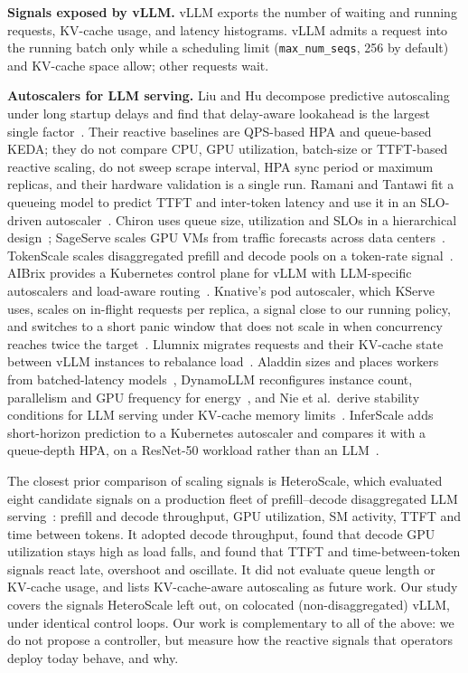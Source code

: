 \documentclass[10pt,conference]{IEEEtran}
\begin{document}
\textbf{Signals exposed by vLLM.} vLLM exports the number of waiting and
running requests, KV-cache usage, and latency histograms. vLLM admits a
request into the running batch only while a scheduling limit
(\texttt{max\_num\_seqs}, 256 by default) and KV-cache space allow; other
requests wait.

\textbf{Autoscalers for LLM serving.} Liu and Hu decompose predictive
autoscaling under long startup delays and find that delay-aware lookahead is
the largest single factor~\cite{liu2026decomposing}. Their reactive baselines
are QPS-based HPA and queue-based KEDA; they do not compare CPU, GPU
utilization, batch-size or TTFT-based reactive scaling, do not sweep scrape
interval, HPA sync period or maximum replicas, and their hardware validation
is a single run. Ramani and Tantawi fit a queueing model to predict TTFT and
inter-token latency and use it in an SLO-driven
autoscaler~\cite{ramani2026queueing}. Chiron uses queue size, utilization and
SLOs in a hierarchical design~\cite{patke2025chiron}; SageServe scales GPU VMs
from traffic forecasts across data centers~\cite{jaiswal2025sageserve}. TokenScale scales disaggregated prefill and decode pools on a token-rate
signal~\cite{lai2025tokenscale}. AIBrix provides a Kubernetes control plane for
vLLM with LLM-specific autoscalers and load-aware routing~\cite{aibrix2025}.
Knative's pod autoscaler, which KServe uses, scales on in-flight requests per
replica, a signal close to our running policy, and switches to a short panic
window that does not scale in when concurrency reaches twice the
target~\cite{knativekpa}. Llumnix migrates requests and their KV-cache state
between vLLM instances to rebalance load~\cite{sun2024llumnix}.
Aladdin sizes and places workers from batched-latency
models~\cite{nie2024aladdin}, DynamoLLM reconfigures instance count, parallelism
and GPU frequency for energy~\cite{stojkovic2025dynamollm}, and Nie et al.\
derive stability conditions for LLM serving under KV-cache memory
limits~\cite{nie2026stability}. InferScale adds short-horizon prediction to a
Kubernetes autoscaler and compares it with a queue-depth HPA, on a ResNet-50
workload rather than an LLM~\cite{huang2026inferscale}.

The closest prior comparison of scaling signals is HeteroScale, which evaluated
eight candidate signals on a production fleet of prefill--decode disaggregated
LLM serving~\cite{li2025heteroscale}: prefill and decode throughput, GPU
utilization, SM activity, TTFT and time between tokens. It adopted decode
throughput, found that decode GPU utilization stays high as load falls, and
found that TTFT and time-between-token signals react late, overshoot and
oscillate. It did not evaluate queue length or KV-cache usage, and lists
KV-cache-aware autoscaling as future work. Our study covers the signals HeteroScale left out, on colocated
(non-disaggregated) vLLM, under identical control loops. Our work is
complementary to all of the above: we do not propose a controller, but measure
how the reactive signals that operators deploy today behave, and why.
\end{document}
